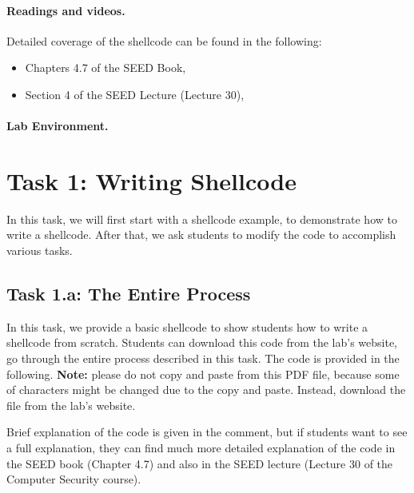 \paragraph{Readings and videos.}
Detailed coverage of the shellcode can be found in the following:

\begin{itemize}
\item Chapters 4.7 of the SEED Book, \seedbook
\item Section 4 of the SEED Lecture (Lecture 30), \seedcsvideo
\end{itemize}


\paragraph{Lab Environment.} 
\seedenvironment

\section{Task 1: Writing Shellcode}


In this task, we will first start with a shellcode example,
to demonstrate how to write a shellcode. After that, we ask
students to modify the code to accomplish various tasks. 



\subsection{Task 1.a: The Entire Process}

In this task, we provide a basic shellcode to show students 
how to write a shellcode from scratch. Students 
can download this code from the lab's website, go through
the entire process described in this task. 
The code is 
provided in the following. \textbf{Note:} please do not copy and paste from
this PDF file, because some of characters might be changed
due to the copy and paste. Instead, download the file from
the lab's website. 

Brief explanation of the code is given in the comment, but if students 
want to see a full explanation, they can find much more detailed explanation 
of the code in the SEED book (Chapter 4.7) and also 
in the SEED lecture (Lecture 30 of the Computer Security course). 


